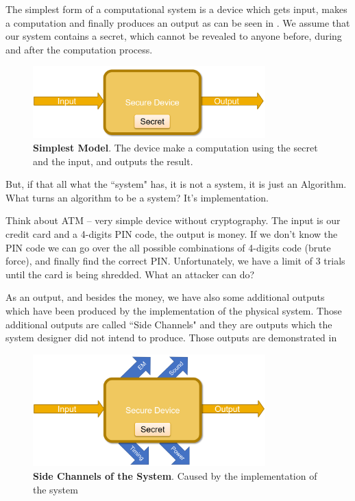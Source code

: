 The simplest form of a computational system is a device which gets input, makes a computation and finally produces an output as can be seen in . We assume that our system contains a secret, which cannot be revealed to anyone before, during and after the computation process. 

\begin{figure}[!ht]
    \centering
    \includegraphics[width=0.8\textwidth]{images/ch1_Intro/Secure_device1.png}
    \caption{\textbf{Simplest Model}. The device make a computation using the secret and the input, and outputs the result.} \label{fig:SecDev1}
\end{figure}

But, if that all what the ``system" has, it is not a system, it is just an Algorithm. What turns an algorithm to be a system? It's implementation.

Think about ATM – very simple device without cryptography. The input is our credit card and a 4-digits PIN code, the output is money. If we don't know the PIN code we can go over the all possible combinations of 4-digits code (brute force), and finally find the correct PIN. Unfortunately, we have a limit of 3 trials until the card is being shredded. What an attacker can do?

As an output, and besides the money, we have also some additional outputs which have been produced by the implementation of the physical system. Those additional outputs are called ``Side Channels" and they are outputs which the system designer did not intend to produce. Those outputs are demonstrated in 

\begin{figure}[!ht]
    \centering
    \includegraphics[width=0.8\textwidth]{images/ch1_Intro/Secure_device2.png}
    \caption{\textbf{Side Channels of the System}. Caused by the implementation of the system}
    \label{fig:SecDev2}
\end{figure}

